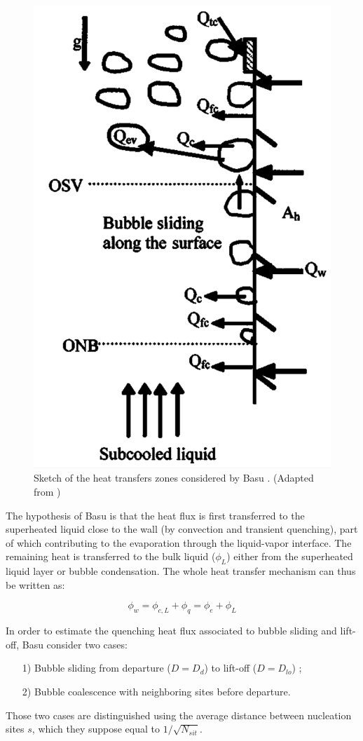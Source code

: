 \begin{figure}[h]
\centering
\includegraphics[width=0.5\linewidth]{img/HFP/Basu/zones.PNG}
\caption{Sketch of the heat transfers zones considered by Basu \etal. (Adapted from \cite{basu2005})}
\label{fig:Basu_zones}
\end{figure}
	

The hypothesis of Basu \etal is that the heat flux is first transferred to the superheated liquid close to the wall (by convection and transient quenching), part of which contributing to the evaporation through the liquid-vapor interface. The remaining heat is transferred to the bulk liquid ($\phi_{L}$) either from the superheated liquid layer or bubble condensation. The whole heat transfer mechanism can thus be written as:

\begin{equation}
\phi_{w} = \phi_{c,L}+\phi_{q} = \phi_{e} + \phi_{L}
\label{eq:HFP_B_tot}
\end{equation}

In order to estimate the quenching heat flux associated to bubble sliding and lift-off, Basu \etal consider two cases: 

\begin{itemize}
\item[1)] Bubble sliding from departure ($D=D_{d}$) to lift-off ($D=D_{lo}$) ;
\item[2)] Bubble coalescence with neighboring sites before departure.
\end{itemize} 

Those two cases are distinguished using the average distance between nucleation sites $s$, which they suppose equal to $1/\sqrt{N_{sit}}$.

